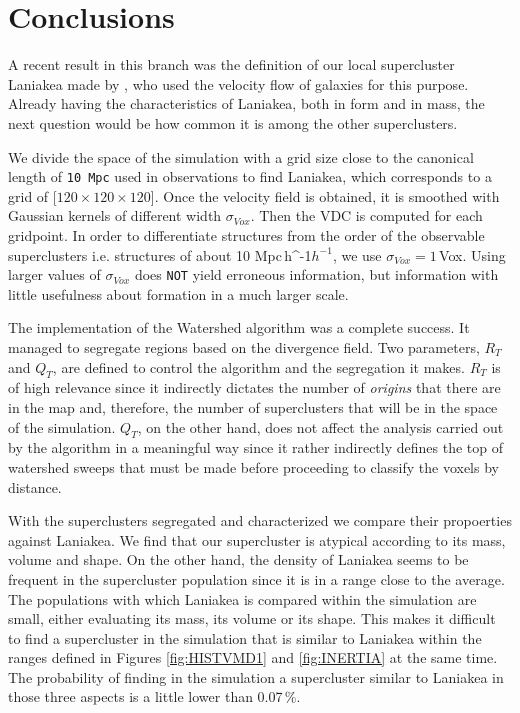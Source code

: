 \documentclass[usenatbib]{mnras}
\newcommand{\Mpch}{\,{\rm Mpc}\,\ifmmode h^{-1}\else $h^{-1}$\fi}
\begin{document}
\section{Conclusions}
\label{sec:conclusions}

A recent result in this branch was the definition of our local supercluster Laniakea made by \cite{2014Natur.513...71T}, who used the velocity flow of galaxies for this purpose. Already having the characteristics of Laniakea, both in form and in mass, the next question would be how common it is among the other superclusters.

We divide the space of the simulation with a grid size close to the canonical length of \texttt{10\,Mpc} used in observations to find Laniakea, which corresponds to a grid of [$120 \times 120 \times 120$]. Once the velocity field is obtained, it is smoothed with Gaussian kernels of different width $\sigma_{Vox}$. Then the VDC is computed for each gridpoint. In order to differentiate structures from the order of the observable superclusters i.e. structures of about 10\,\Mpch, we use $\sigma_{Vox} = 1$\,Vox. Using larger values of $\sigma_{Vox}$ does \texttt{NOT} yield erroneous information, but information with little usefulness about formation in a much larger scale.  

The implementation of the Watershed algorithm was a complete success. It managed to segregate regions based on the divergence field. Two parameters, $R_T$ and $Q_T$, are defined to control the algorithm and the segregation it makes. $R_T$ is of high relevance since it indirectly dictates the number of \emph{origins} that there are in the map and, therefore, the number of superclusters that will be in the space of the simulation. $Q_T$, on the other hand, does not affect the analysis carried out by the algorithm in a meaningful way since it rather indirectly defines the top of watershed sweeps that must be made before proceeding to classify the voxels by distance.

With the superclusters segregated and characterized we compare their propoerties against Laniakea. We find that our supercluster is  atypical according to its mass, volume and shape. On the other hand, the density of Laniakea seems to be frequent in the supercluster population since it is in a range close to the average. The populations with which Laniakea is compared within the simulation are small, either evaluating its mass, its volume or its shape. This makes it difficult to find a supercluster in the simulation that is similar to Laniakea within the ranges defined in Figures \ref{fig:HISTVMD1} and \ref{fig:INERTIA} at the same time. The probability of finding in the simulation a supercluster similar to Laniakea in those three aspects is a little lower than 0.07\,\%.
\end{document}
